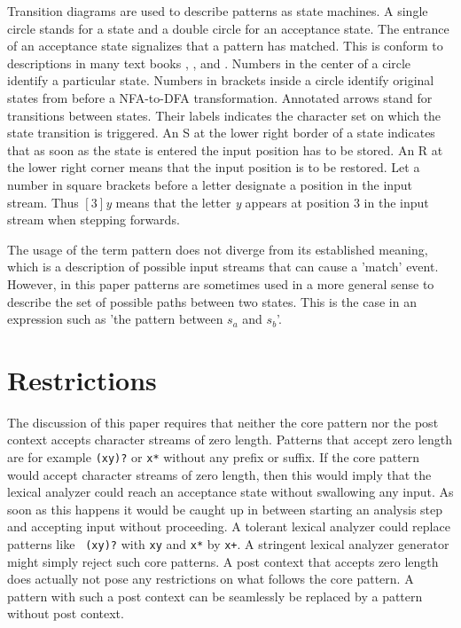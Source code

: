 \documentclass[acmtoplas]{acmtrans2m}
\begin{document}
Transition diagrams are used to describe patterns as state machines. A
single circle stands for a state and a double circle for an acceptance
state.  The entrance of an acceptance state signalizes that a pattern
has matched.  This is conform to descriptions in many text books
\cite{Cooper:2004}, \cite{Louden:1997}, and \cite{Aho:2007}. Numbers in
the center of a circle identify a particular state.
Numbers in brackets inside a circle identify original states from
before a NFA-to-DFA transformation.  Annotated arrows stand for
transitions between states. Their labels indicates the character set on
which the state transition is triggered.  An {\sf S} at the lower right
border of a state indicates that as soon as the state is entered
the input position has to be stored. An {\sf R} at the lower right
corner means that the input position is to be restored. Let a number
in square brackets before a letter designate a position in the input stream. Thus
$[3]${\it y} means that the letter {\it y} appears at 
position 3 in the input stream when stepping forwards.

The usage of the term pattern does not diverge from its established meaning,
which is a description of possible input streams that can cause a 'match'
event. However, in this paper patterns are sometimes used in a more general
sense to describe the set of possible paths between two states. This is the
case in an expression such as 'the pattern between $s_a$ and $s_b$'.

\section{Restrictions}

The discussion of this paper requires that neither the core pattern nor the
post context accepts character streams of zero length. Patterns that accept
zero length are for example {\tt (xy)?} or {\tt x*} without any prefix or
suffix.  If the core pattern would accept character streams of zero length,
then this would imply that the lexical analyzer could reach an acceptance
state without swallowing any input.  As soon as this happens it would be
caught up in between starting an analysis step and accepting input without
proceeding. A tolerant lexical analyzer could replace patterns like {\tt
(xy)?} with {\tt xy} and {\tt x*} by {\tt x+}.  A stringent lexical
analyzer generator might simply reject such core patterns. A post
context that accepts zero length does actually not pose any
restrictions on what follows the core pattern. A pattern with such a
post context can be seamlessly be replaced by a pattern without post
context.
\end{document}

